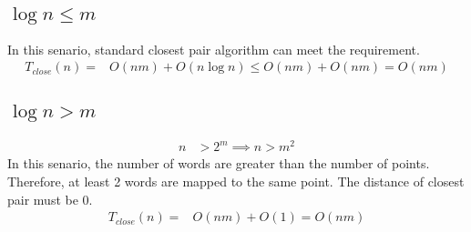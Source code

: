 \documentclass{article}
\begin{document}
\subsection{$\log n \leq m$}
In this senario, standard closest pair algorithm can meet the requirement.
\begin{align*}
T_{close}(n) =& O(nm) + O(n \log n) \leq O(nm) + O(n m) = O(nm)
\end{align*}
\subsection{$\log n > m$}
\begin{align*}
n &> 2^m \implies n > m^2
\end{align*}
In this senario, the number of words are greater than the number of points.
Therefore, at least 2 words are mapped to the same point. The distance of
closest pair must be 0.
\begin{align*}
T_{close}(n) =& O(nm) + O(1) = O(nm)
\end{align*}
\end{document}
